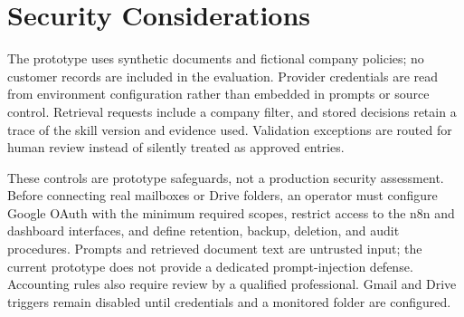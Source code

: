 \section{Security Considerations}
\label{sec:security}

The prototype uses synthetic documents and fictional company policies; no
customer records are included in the evaluation. Provider credentials are read
from environment configuration rather than embedded in prompts or source
control. Retrieval requests include a company filter, and stored decisions
retain a trace of the skill version and evidence used. Validation exceptions
are routed for human review instead of silently treated as approved entries.

These controls are prototype safeguards, not a production security assessment.
Before connecting real mailboxes or Drive folders, an operator must configure
Google OAuth with the minimum required scopes, restrict access to the n8n and
dashboard interfaces, and define retention, backup, deletion, and audit
procedures. Prompts and retrieved document text are untrusted input; the
current prototype does not provide a dedicated prompt-injection defense.
Accounting rules also require review by a qualified professional. Gmail and
Drive triggers remain disabled until credentials and a monitored folder are
configured.
